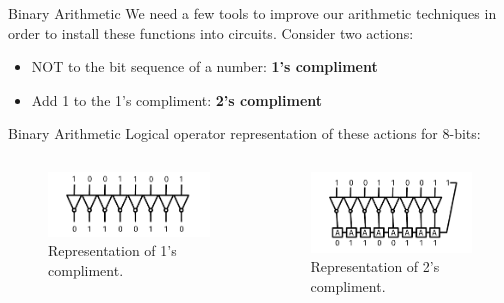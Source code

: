 \documentclass{beamer}
\begin{document}
\begin{frame}{Binary Arithmetic}
We need a few tools to improve our arithmetic techniques in order to install these functions into circuits.  Consider two actions:
\begin{itemize}
\item NOT to the bit sequence of a number: \textbf{\alert{1's compliment}}
\item Add 1 to the 1's compliment: \textbf{\alert{2's compliment}}
\end{itemize}
\end{frame}

\begin{frame}{Binary Arithmetic}
Logical operator representation of these actions for 8-bits: \\ \vspace{0.5cm}
\hrulefill
\begin{columns}[T]
\begin{column}{0.5\textwidth}
\begin{figure}
\centering
\includegraphics[width=\textwidth]{figures/1Compliment.pdf}
\caption{\label{fig:1comp} Representation of 1's compliment.}
\end{figure}
\end{column}
\begin{column}{0.5\textwidth}
\begin{figure}
\centering
\includegraphics[width=\textwidth]{figures/2Compliment.pdf}
\caption{\label{fig:2comp} Representation of 2's compliment.}
\end{figure}
\end{column}
\end{columns}
\end{frame}
\end{document}
